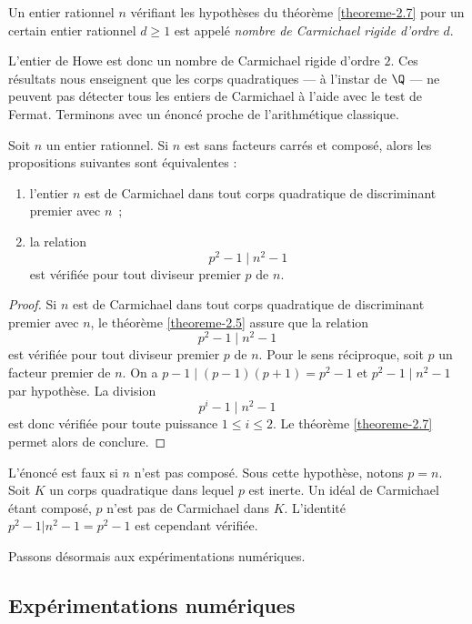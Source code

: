 \begin{definition}
	Un entier rationnel $n$ vérifiant les hypothèses du théorème \ref{theoreme-2.7} pour un certain entier rationnel $d\geq 1$ est appelé \emph{nombre de Carmichael rigide d'ordre $d$}.
\end{definition}

L'entier de Howe est donc un nombre de Carmichael rigide d'ordre $2$. Ces résultats nous enseignent que les corps quadratiques — à l'instar de $\Q$ — ne peuvent pas détecter tous les entiers de Carmichael à l'aide avec le test de Fermat. Terminons avec un énoncé proche de l'arithmétique classique.

\begin{corollaire}
	Soit $n$ un entier rationnel. Si $n$ est sans facteurs carrés et composé, alors les propositions suivantes sont équivalentes :
	\begin{enumerate}
		\item l'entier $n$ est de Carmichael dans tout corps quadratique de discriminant premier avec $n$~;
		\item la relation \[p^2 - 1 \mid n^2 - 1\] est vérifiée pour tout diviseur premier $p$ de $n$.
	\end{enumerate}
\end{corollaire}

\begin{proof}
	Si $n$ est de Carmichael dans tout corps quadratique de discriminant premier avec $n$, le théorème \ref{theoreme-2.5} assure que la relation \[p^2 - 1 \mid n^2 - 1\] est vérifiée pour tout diviseur premier $p$ de $n$. Pour le sens réciproque, soit $p$ un facteur premier de $n$. On a $p-1\mid (p-1)(p+1) = p^2 - 1$ et $p^2 - 1 \mid n^2 - 1$ par hypothèse. La division \[p^i - 1 \mid n^2 - 1\] est donc vérifiée pour toute puissance $1\leq i \leq 2$. Le théorème \ref{theoreme-2.7} permet alors de conclure.
\end{proof}

\begin{remarque}
	L'énoncé est faux si $n$ n'est pas composé. Sous cette hypothèse, notons $p=n$. Soit $K$ un corps quadratique dans lequel $p$ est inerte. Un idéal de Carmichael étant composé, $p$ n'est pas de Carmichael dans $K$. L'identité $p^2 - 1 | n^2 - 1 = p^2 - 1$ est cependant vérifiée.
\end{remarque}

Passons désormais aux expérimentations numériques.

\subsection{Expérimentations numériques}

